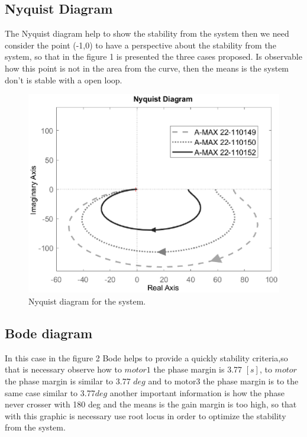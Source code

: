 \documentclass[12pt]{article}
\begin{document}
\subsection{Nyquist Diagram}
The Nyquist diagram help to show the stability from the system then we need consider the point (-1,0) to have a perspective about the stability from the system, so that in the figure 1 is presented the three cases proposed. Is observable how this point is not in the area from the curve, then the means is the system don't is stable with a open loop.
\begin{figure}[H]
\centering		
		\includegraphics[scale=0.8]{nyquist.eps}
		\captionsetup{justification=centering}
		\caption{Nyquist diagram for the system.}
		\label{f1}
\end{figure}

\subsection{Bode diagram}
In this case in the figure 2 Bode helps to provide a quickly stability criteria,so that is necessary observe how to $motor1$ the phase margin is 3.77 $[s]$, to $motor$ the phase margin is similar to 3.77 $deg$ and to motor3 the phase margin is to the same case similar to 3.77$deg$ another important information is how the phase never crosser with 180 deg and the means is the gain margin is too high, so that with this graphic is necessary use root locus in order to optimize the stability from the system.
\end{document}
